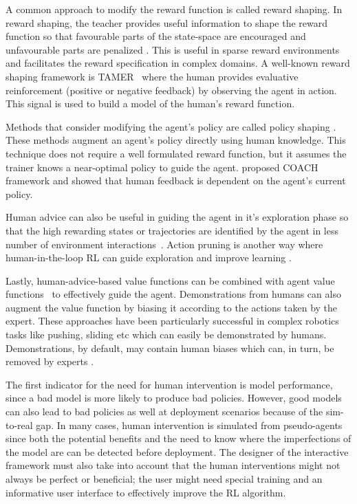 \documentclass[twoside,11pt]{article}
\begin{document}
A common approach to modify the reward function is called reward shaping. In reward shaping, the teacher provides useful information to shape the reward function so that favourable parts of the state-space are encouraged and unfavourable parts are penalized \citep{ng:99}. This is useful in sparse reward environments and facilitates the reward specification in complex domains. A well-known reward shaping framework is TAMER~\citep{Knox:2008:TAMER, knox:13} where the human provides evaluative reinforcement (positive or negative feedback) by observing the agent in action. This signal is used to build a model of the human's reward function. 

Methods that consider modifying the agent's policy are called policy shaping \citep{griffith2013policy,cederborg2015policy,WuEtAl:2021:HITLDRLAutonomousDriving}. These methods augment an agent's policy directly using human knowledge. This technique does not require a well formulated reward function, but it assumes the trainer knows a near-optimal policy to guide the agent. \citet{macglashan2017interactive} proposed COACH framework and showed that human feedback is dependent on the agent’s current policy. 

Human advice can also be useful in guiding the agent in it’s exploration phase so that the high rewarding states or trajectories are identified by the agent in less number of environment interactions~\citep{amir2016interactive}. Action pruning is another way where human-in-the-loop RL can guide exploration and improve learning \citep{Abel:2017:AgentAgnosticHumanInTheLoopRL}.

Lastly, human-advice-based value functions can be combined with agent value functions~\citep{taylor2011integrating, kartoun:10,jiang:21, WuEtAl:2021:HITLDRLAutonomousDriving} to effectively guide the agent. Demonstrations \citep{hester2018deep,vecerik2017leveraging,nair2018overcoming} from humans can also augment the value function by biasing it according to the  actions taken by the expert. These approaches have been particularly successful in complex robotics tasks like pushing, sliding etc which can easily be demonstrated by humans.  Demonstrations, by default, may contain human biases which can, in turn, be removed by experts \citep{Wang:2022:SkillPreferences}.

The first indicator for the need for human intervention is model performance, since a bad model is more likely to produce bad policies. However, good models can also lead to bad policies as well at deployment scenarios because of the sim-to-real gap. In many cases, human intervention is simulated from pseudo-agents since both the potential benefits and the need to know where the imperfections of the model are can be detected before deployment. The designer of the interactive framework must also take into account that the human interventions might not always be perfect or beneficial; the user might need special training and an informative user interface to effectively improve the RL algorithm. 
\end{document}
